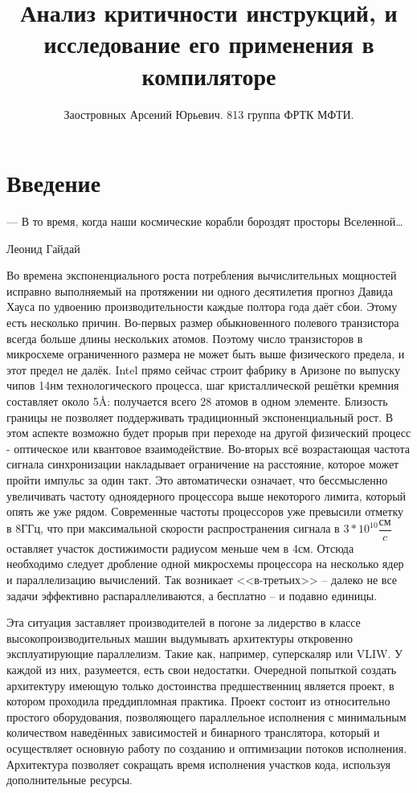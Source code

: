 \documentclass[a4paper,12pt,titlepage]{article}
\title{Анализ критичности инструкций, и исследование его применения в компиляторе}
\author{Заостровных Арсений Юрьевич. 813 группа ФРТК МФТИ.}
\begin{document}

\tableofcontents
\pagebreak
\section{Введение}
\epigraph{ — В то время, когда наши космические корабли бороздят просторы Вселенной…}{Леонид Гайдай}
Во времена экспоненциального роста потребления вычислительных мощностей исправно выполняемый на протяжении ни одного десятилетия прогноз Давида Хауса по удвоению производительности каждые полтора года даёт сбои. Этому есть несколько причин.
 Во-первых размер обыкновенного полевого транзистора всегда больше длины нескольких атомов. Поэтому число транзисторов в микросхеме ограниченного размера не может быть выше физического предела, и этот предел не далёк. Intel прямо сейчас строит фабрику в Аризоне по выпуску чипов 14нм технологического процесса, шаг кристаллической решётки кремния составляет около 5\AA: получается всего 28 атомов в одном элементе. Близость границы не позволяет поддерживать традиционный экспоненциальный рост. В этом аспекте возможно будет прорыв при переходе на другой физический процесс - оптическое или квантовое взаимодействие.
 Во-вторых всё возрастающая частота сигнала синхронизации накладывает ограничение на расстояние, которое может пройти импульс за один такт. Это автоматически означает, что бессмысленно увеличивать частоту одноядерного процессора выше некоторого лимита, который опять же уже рядом. Современные частоты процессоров уже превысили отметку в 8ГГц, что при максимальной скорости распространения сигнала в $3*10^{10}{\dfrac{\text{см}}{c}}$ оставляет участок достижимости радиусом меньше чем в 4см.
 Отсюда необходимо следует дробление одной микросхемы процессора на несколько ядер и параллелизацию вычислений. Так возникает <<в-третьих>> -- далеко не все задачи эффективно распараллеливаются, а бесплатно -- и подавно единицы.

Эта ситуация заставляет производителей в погоне за лидерство в классе высокопроизводительных машин выдумывать архитектуры откровенно эксплуатирующие параллелизм. Такие как, например, суперскаляр или VLIW. У каждой из них, разумеется, есть свои недостатки. Очередной попыткой создать архитектуру имеющую только достоинства предшественниц является проект, в котором проходила преддипломная практика. Проект состоит из относительно простого оборудования, позволяющего параллельное исполнения с минимальным количеством наведённых зависимостей и бинарного транслятора, который и осуществляет основную работу по созданию и оптимизации потоков исполнения. Архитектура позволяет сокращать время исполнения участков кода, используя дополнительные ресурсы.
\end{document}
